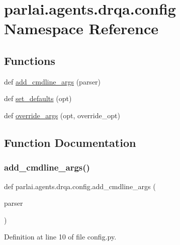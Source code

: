 \hypertarget{namespaceparlai_1_1agents_1_1drqa_1_1config}{}\section{parlai.\+agents.\+drqa.\+config Namespace Reference}
\label{namespaceparlai_1_1agents_1_1drqa_1_1config}
\subsection*{Functions}
\begin{DoxyCompactItemize}
\item 
def \hyperlink{namespaceparlai_1_1agents_1_1drqa_1_1config_a62fdd5554f1da6be0cba185271058320}{add\+\_\+cmdline\+\_\+args} (parser)
\item 
def \hyperlink{namespaceparlai_1_1agents_1_1drqa_1_1config_a8cc825bafeff299794cba6e2a8b65da2}{set\+\_\+defaults} (opt)
\item 
def \hyperlink{namespaceparlai_1_1agents_1_1drqa_1_1config_a0fd9c7cd1129e5b4a7c0315b9f03c31a}{override\+\_\+args} (opt, override\+\_\+opt)
\end{DoxyCompactItemize}


\subsection{Function Documentation}
\mbox{\label{namespaceparlai_1_1agents_1_1drqa_1_1config_a62fdd5554f1da6be0cba185271058320}} 
\subsubsection{\texorpdfstring{add\+\_\+cmdline\+\_\+args()}{add\_cmdline\_args()}}
{\footnotesize\ttfamily def parlai.\+agents.\+drqa.\+config.\+add\+\_\+cmdline\+\_\+args (\begin{DoxyParamCaption}\item[{}]{parser }\end{DoxyParamCaption})}



Definition at line 10 of file config.\+py.


